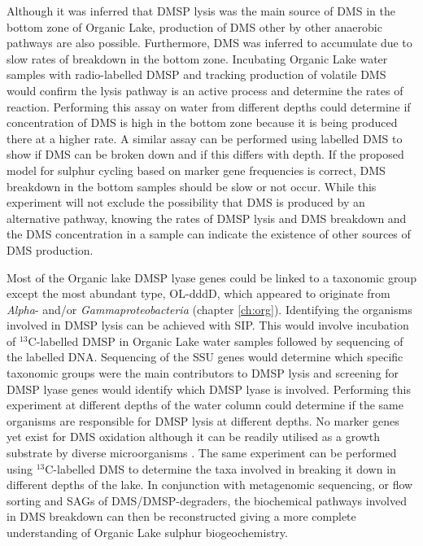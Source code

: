 Although it was inferred that \ac{DMSP} lysis was the main source of \ac{DMS} in the bottom zone of Organic Lake, production of \ac{DMS} other by other anaerobic pathways are also possible.
Furthermore, \ac{DMS} was inferred to accumulate due to slow rates of breakdown in the bottom zone.
Incubating Organic Lake water samples with radio-labelled \ac{DMSP} and tracking production of volatile \ac{DMS} would confirm the lysis pathway is an active process and determine the rates of reaction.
Performing this assay on water from different depths could determine if concentration of \ac{DMS} is high in the bottom zone because it is being produced there at a higher rate.
A similar assay can be performed using labelled \ac{DMS} to show if \ac{DMS} can be broken down and if this differs with depth.
If the proposed model for sulphur cycling based on marker gene frequencies is correct, \ac{DMS} breakdown in the bottom samples should be slow or not occur.
While this experiment will not exclude the possibility that \ac{DMS} is produced by an alternative pathway, knowing the rates of \ac{DMSP} lysis and \ac{DMS} breakdown and the \ac{DMS} concentration in a sample can indicate the existence of other sources of \ac{DMS} production.

Most of the Organic lake \ac{DMSP} lyase genes could be linked to a taxonomic group except the most abundant type, OL-dddD, which appeared to originate from \emph{Alpha}- and/or \emph{Gammaproteobacteria} (chapter \ref{ch:org}).
Identifying the organisms involved in \ac{DMSP} lysis can be achieved with \ac{SIP}.
This would involve incubation of $^{13}$C-labelled \ac{DMSP} in Organic Lake water samples followed by sequencing of the labelled DNA.
Sequencing of the \ac{SSU} genes would determine which specific taxonomic groups were the main contributors to \ac{DMSP} lysis and screening for \ac{DMSP} lyase genes would identify which \ac{DMSP} lyase is involved.
Performing this experiment at different depths of the water column could determine if the same organisms are responsible for \ac{DMSP} lysis at different depths.
No marker genes yet exist for \ac{DMS} oxidation although it can be readily utilised as a growth substrate by diverse microorganisms \cite{Johnston2008}.
The same experiment can be performed using $^{13}$C-labelled \ac{DMS} to determine the taxa involved in breaking it down in different depths of the lake.
In conjunction with metagenomic sequencing, or flow sorting and \acp{SAG} of \ac{DMS}/\ac{DMSP}-degraders, the biochemical pathways involved in \ac{DMS} breakdown can then be reconstructed giving a more complete understanding of Organic Lake sulphur biogeochemistry.

